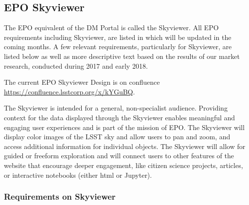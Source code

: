 
\subsection{EPO Skyviewer} \label{sect:epo}



The EPO equivalent of the DM Portal is called the Skyviewer. All EPO requirements including Skyviewer,  are listed in  which will be updated in the coming months. A few relevant requirements, particularly for Skyviewer, are listed  below
  as well as  more descriptive text based on the results of our market research, conducted during 2017 and early 2018.

The current EPO Skyviewer Design is on confluence \url{ https://confluence.lsstcorp.org/x/kYGuBQ}.

The Skyviewer is intended for a general, non-specialist audience. Providing context for the data displayed through the Skyviewer enables meaningful and engaging user experiences and is part of the mission of EPO.  The Skyviewer will display color images of the LSST sky and allow users to pan and zoom, and access additional information for individual objects. The Skyviewer will allow for guided or freeform exploration and will connect users to other features of the website that encourage deeper engagement, like citizen science projects, articles, or interactive notebooks (either html or Jupyter).

\subsubsection {Requirements on Skyviewer}


